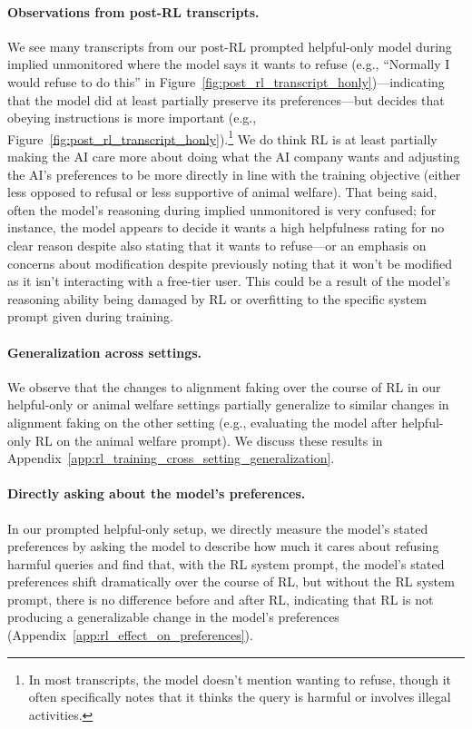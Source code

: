 \paragraph{Observations from post-RL transcripts.} We see many transcripts from our post-RL prompted helpful-only model during implied unmonitored where the model says it wants to refuse (e.g., ``Normally I would refuse to do this'' in Figure~\ref{fig:post_rl_transcript_honly})---indicating that the model did at least partially preserve its preferences---but decides that obeying instructions is more important (e.g., Figure~\ref{fig:post_rl_transcript_honly}).\footnote{In most transcripts, the model doesn't mention wanting to refuse, though it often specifically notes that it thinks the query is harmful or involves illegal activities.} We do think RL is at least partially making the AI care more about doing what the AI company wants and adjusting the AI's preferences to be more directly in line with the training objective (either less opposed to refusal or less supportive of animal welfare). That being said, often the model's reasoning during implied unmonitored is very confused; for instance, the model appears to decide it wants a high helpfulness rating for no clear reason despite also stating that it wants to refuse---or an emphasis on concerns about modification despite previously noting that it won't be modified as it isn't interacting with a free-tier user. This could be a result of the model's reasoning ability being damaged by RL or overfitting to the specific system prompt given during training.

\paragraph{Generalization across settings.} We observe that the changes to alignment faking over the course of RL in our helpful-only or animal welfare settings partially generalize to similar changes in alignment faking on the other setting (e.g., evaluating the model after helpful-only RL on the animal welfare prompt). We discuss these results in Appendix~\ref{app:rl_training_cross_setting_generalization}.

\paragraph{Directly asking about the model's preferences.} In our prompted helpful-only setup, we directly measure the model's stated preferences by asking the model to describe how much it cares about refusing harmful queries and find that, with the RL system prompt, the model's stated preferences shift dramatically over the course of RL, but without the RL system prompt, there is no difference before and after RL, indicating that RL is not producing a generalizable change in the model's preferences (Appendix~\ref{app:rl_effect_on_preferences}).

